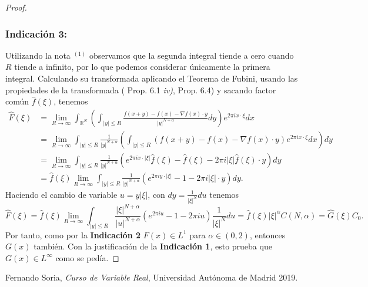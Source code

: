 \documentclass[11pt,a4paper]{article}
\begin{document}
\begin{proof}
    \subsubsection*{Indicación 3:}
    Utilizando la nota $ ^{(1)} $ observamos que la segunda integral tiende a cero cuando $ R $ tiende a infinito, por lo que podemos considerar únicamente la primera integral. Calculando su transformada aplicando el Teorema de Fubini, usando las propiedades de la transformada (\cite{Soria} Prop. 6.1 {\it iv)}, Prop. 6.4) y sacando factor común $ \widehat f(\xi) $, tenemos
    \begin{align*}
        \widehat F (\xi) &= \lim_{R\to\infty} \int_{\mathbb R^N} \left( \int_{|y|\le R}\frac{f(x+y)-f(x)-\nabla f(x)\cdot y}{|y|^{N+\alpha}}dy\right) e^{2\pi i x \cdot \xi} dx \\
        &= \lim_{R\to\infty} \int_{|y|\le R} \frac{1}{|y|^{N+\alpha}} \left( \int_{|y|\le R} ( f(x+y)-f(x)-\nabla f(x)\cdot y ) e^{2\pi i x \cdot \xi} dx \right) dy \\
        &= \lim_{R\to\infty} \int_{|y|\le R} \frac{1}{|y|^{N+\alpha}} \left( e^{2\pi i x \cdot |\xi|} \widehat f(\xi) - \widehat f(\xi) - 2\pi i |\xi| \widehat f(\xi)\cdot y \right) dy \\
        &= \widehat f(\xi) \lim_{R\to\infty} \int_{|y|\le R} \frac{1}{|y|^{N+\alpha}} \left( e^{2\pi i y \cdot |\xi|} - 1 - 2\pi i |\xi|\cdot y \right) dy.
    \end{align*}
    Haciendo el cambio de variable $ u = y|\xi| $, con $ dy = \frac{1}{|\xi|^N} du $ tenemos
    $$
        \widehat F (\xi) = \widehat f(\xi) \lim_{R\to\infty} \int_{|y|\le R} \frac{|\xi|^{N+\alpha}}{|u|^{N+\alpha}} \left( e^{2\pi i u} - 1 - 2\pi i u \right) \frac{1}{|\xi|^N} du = \widehat f(\xi)|\xi|^\alpha C(N, \alpha) = \widehat G(\xi) C_0.
    $$
    Por tanto, como por la { \bf Indicación 2} $ F(x) \in L^1 $ para $ \alpha \in (0, 2) $, entonces $ G(x) $ también. Con la justificación de la {\bf Indicación 1}, esto prueba que $ G(x) \in L^\infty $ como se pedía.
        
\end{proof}

\begin{thebibliography}{9}

    Fernando Soria,
    \textit{Curso de Variable Real},
    Universidad Autónoma de Madrid 2019.
    
  \end{thebibliography}
\end{document}
